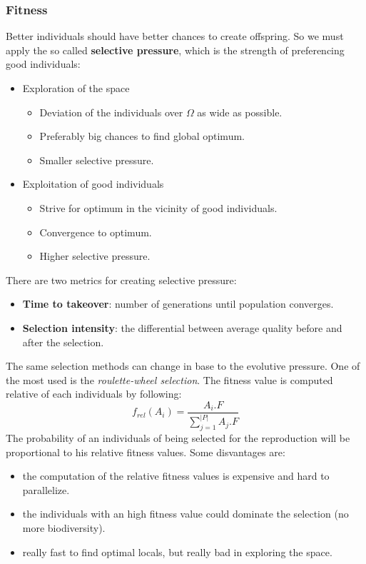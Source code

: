 \documentclass{article}
\begin{document}
\subsubsection{Fitness}
Better individuals should have better chances to create offspring. So we must apply the so
called \textbf{selective pressure}, which is the strength of preferencing good individuals:
\begin{itemize}
    \item Exploration of the space
          \begin{itemize}
              \item Deviation of the individuals over $\Omega$ as wide as possible.
              \item Preferably big chances to find global optimum.
              \item Smaller selective pressure.
          \end{itemize}
    \item Exploitation of good individuals
          \begin{itemize}
              \item Strive for optimum in the vicinity of good individuals.
              \item Convergence to optimum.
              \item Higher selective pressure.
          \end{itemize}
\end{itemize}
There are two metrics for creating selective pressure:
\begin{itemize}
    \item \textbf{Time to takeover}: number of generations until population converges.
    \item \textbf{Selection intensity}: the differential between average quality before and after the selection.
\end{itemize}
The same selection methods can change in base to the evolutive pressure. One of the most used is the
\textit{roulette-wheel selection}. The fitness value is computed relative of each individuals by following:
$$f_{rel}(A_i)=\frac{A_i.F}{\sum_{j=1}^{|P|}A_j.F}$$
The probability of an individuals of being selected for the reproduction will be proportional to
his relative fitness values. Some disvantages are:
\begin{itemize}
    \item the computation of the relative fitness values is expensive and hard to parallelize.
    \item the individuals with an high fitness value could dominate the selection (no more biodiversity).
    \item really fast to find optimal locals, but really bad in exploring the space.
\end{itemize}
\end{document}
